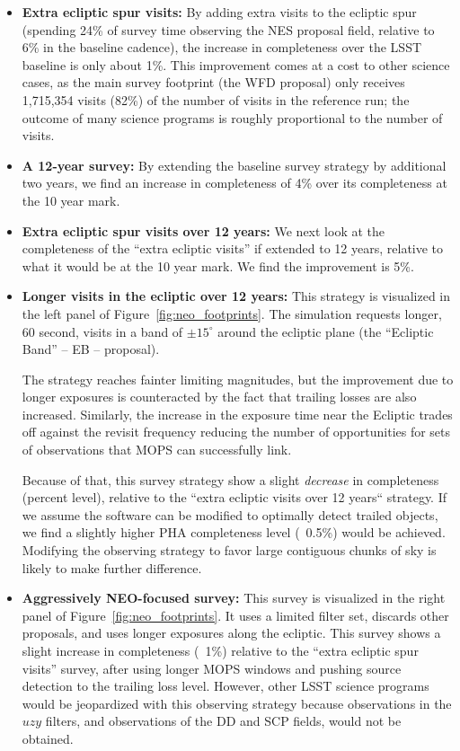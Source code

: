 \begin{itemize}
\item \textbf{Extra ecliptic spur visits:} By adding extra visits to the ecliptic spur (spending 24\% of survey time observing the NES proposal field, relative to 6\% in the baseline cadence), the increase in completeness over the LSST baseline is only about 1\%. This improvement comes at a cost to other science cases, as the main survey footprint (the WFD proposal) only receives 1,715,354 visits (82\%) of the number of visits in the reference run; the outcome of many science programs is roughly proportional to the number of visits.

\item \textbf{A 12-year survey:} By extending the baseline survey strategy by additional two years, we find an increase in completeness of 4\% over its completeness at the 10 year mark.

\item \textbf{Extra ecliptic spur visits over 12 years:} We next look at the completeness of the ``extra ecliptic visits'' if extended to 12 years, relative to what it would be at the 10 year mark. We find the improvement is 5\%.

\item \textbf{Longer visits in the ecliptic over 12 years:} This strategy is visualized in the left panel of Figure~\ref{fig:neo_footprints}. The simulation requests longer, 60 second, visits in a band of $\pm 15^\circ$ around the ecliptic plane (the ``Ecliptic Band'' -- EB -- proposal).

The strategy reaches fainter limiting magnitudes, but the improvement due to longer exposures is counteracted by the fact that trailing losses are also increased. Similarly, the increase in the exposure time near the Ecliptic trades off against the revisit frequency reducing the number of opportunities for sets of observations that MOPS can successfully link. 

Because of that, this survey strategy show a slight {\em decrease} in completeness (percent level), relative to the ``extra ecliptic visits over 12 years`` strategy. If we assume the software can be modified to optimally detect trailed objects, we find a slightly higher PHA completeness level (~0.5\%) would be achieved. Modifying the observing strategy to favor large contiguous chunks of sky is likely to make further difference.

\item \textbf{Aggressively NEO-focused survey:} This survey is visualized in the right panel of Figure~\ref{fig:neo_footprints}. It uses a limited filter set, discards other proposals, and uses longer exposures along the ecliptic. This survey shows a slight increase in completeness (~1\%) relative to the ``extra ecliptic spur visits'' survey, after using longer MOPS windows and pushing source detection to the trailing loss level.
However, other LSST science programs would be jeopardized with this observing strategy because observations in the $uzy$ filters,
and observations of the DD and SCP fields, would not be obtained.
\end{itemize}

